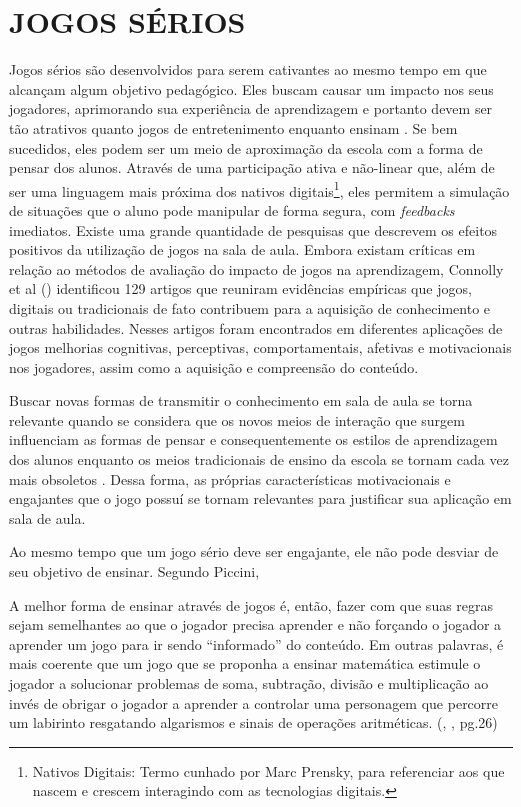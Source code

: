 \section{JOGOS SÉRIOS}
Jogos sérios são desenvolvidos para serem cativantes ao mesmo tempo em que alcançam algum objetivo pedagógico. Eles buscam causar um impacto nos seus jogadores, aprimorando sua experiência de aprendizagem e portanto devem ser tão atrativos quanto jogos de entretenimento enquanto ensinam \cite{bellotti2013}. Se bem sucedidos, eles podem ser um meio de aproximação da escola com a forma de pensar dos alunos. Através de uma participação ativa e não-linear que, além de ser uma linguagem mais próxima dos nativos digitais\footnote{Nativos Digitais: Termo cunhado por Marc Prensky,  para referenciar aos que nascem e crescem interagindo com as tecnologias digitais.}, eles permitem a simulação de situações que o aluno pode manipular de forma segura, com \textit{feedbacks} imediatos. Existe uma grande quantidade de pesquisas que descrevem os efeitos positivos da utilização de jogos na sala de aula. Embora existam críticas em relação ao métodos de avaliação do impacto de jogos na aprendizagem, Connolly et al (\citeyear{connolly2012}) identificou 129 artigos que reuniram evidências empíricas que jogos, digitais ou tradicionais de fato contribuem para a aquisição de conhecimento e outras habilidades. Nesses artigos foram encontrados em diferentes aplicações de jogos melhorias cognitivas, perceptivas, comportamentais, afetivas e motivacionais nos jogadores, assim como a aquisição e compreensão do conteúdo.

Buscar novas formas de transmitir o conhecimento em sala de aula se torna relevante quando se considera que os novos meios de interação que surgem influenciam as formas de pensar e consequentemente os estilos de aprendizagem dos alunos enquanto os meios tradicionais de ensino da escola se tornam cada vez mais obsoletos \cite{prensky2012}. Dessa forma, as próprias características motivacionais e engajantes que o jogo possuí se tornam relevantes para justificar sua aplicação em sala de aula. 

Ao mesmo tempo que um jogo sério deve ser engajante, ele não pode desviar de seu objetivo de ensinar. Segundo Piccini,
\begin{citacao}
A melhor forma de ensinar através de jogos é, então, fazer com que suas regras sejam semelhantes ao que o jogador precisa aprender e não forçando o jogador a aprender um jogo para ir sendo “informado” do conteúdo. Em outras palavras, é mais coerente que um jogo que se proponha a ensinar matemática estimule o jogador a solucionar problemas de soma, subtração, divisão e multiplicação ao invés de obrigar o jogador a aprender a controlar uma personagem que percorre um labirinto resgatando algarismos e sinais de operações aritméticas. (\citeauthor{piccini2008}, \citeyear{piccini2008}, pg.26)
\end{citacao}


